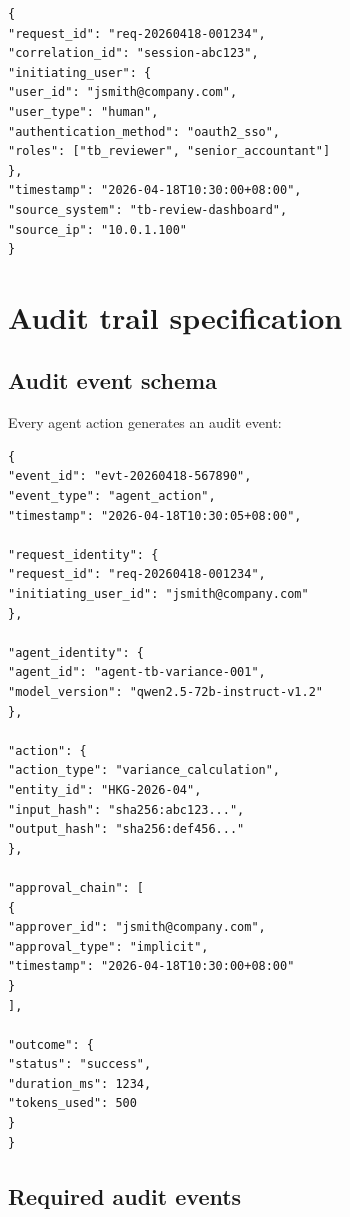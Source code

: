 \documentclass[11pt,a4paper,twoside]{report}
\begin{document}
\begin{lstlisting}[basicstyle=\ttfamily\small,caption={Request identity record schema.}]
{
"request_id": "req-20260418-001234",
"correlation_id": "session-abc123",
"initiating_user": {
"user_id": "jsmith@company.com",
"user_type": "human",
"authentication_method": "oauth2_sso",
"roles": ["tb_reviewer", "senior_accountant"]
},
"timestamp": "2026-04-18T10:30:00+08:00",
"source_system": "tb-review-dashboard",
"source_ip": "10.0.1.100"
}
\end{lstlisting}

\section{Audit trail specification}

\subsection{Audit event schema}

Every agent action generates an audit event:

\begin{lstlisting}[basicstyle=\ttfamily\small,caption={Audit event schema.}]
{
"event_id": "evt-20260418-567890",
"event_type": "agent_action",
"timestamp": "2026-04-18T10:30:05+08:00",

"request_identity": {
"request_id": "req-20260418-001234",
"initiating_user_id": "jsmith@company.com"
},

"agent_identity": {
"agent_id": "agent-tb-variance-001",
"model_version": "qwen2.5-72b-instruct-v1.2"
},

"action": {
"action_type": "variance_calculation",
"entity_id": "HKG-2026-04",
"input_hash": "sha256:abc123...",
"output_hash": "sha256:def456..."
},

"approval_chain": [
{
"approver_id": "jsmith@company.com",
"approval_type": "implicit",
"timestamp": "2026-04-18T10:30:00+08:00"
}
],

"outcome": {
"status": "success",
"duration_ms": 1234,
"tokens_used": 500
}
}
\end{lstlisting}

\subsection{Required audit events}
\end{document}
